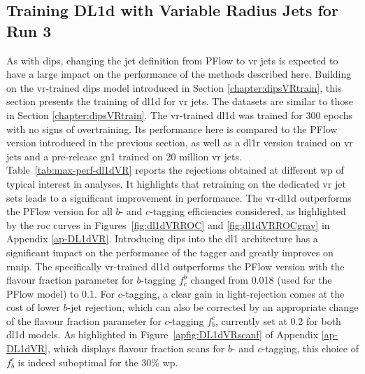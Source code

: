 \subsection{Training DL1d with Variable Radius Jets for Run 3}\label{sec:VRdl1dTrain}
As with \gls{dips}, changing the jet definition from PFlow to \gls{vr} jets is expected to have a large impact on the performance of the methods described here. Building on the \gls{vr}-trained \gls{dips} model introduced in Section \ref{chapter:dipsVRtrain}, this section presents the training of \gls{dl1d} for \gls{vr} jets. The datasets are similar to those in Section \ref{chapter:dipsVRtrain}. The \gls{vr}-trained \gls{dl1d} was trained for 300 epochs with no signs of overtraining. Its performance here is compared to the PFlow version introduced in the previous section, as well as a \gls{dl1r} version trained on \gls{vr} jets and a pre-release \gls{gn1} trained on 20 million \gls{vr} jets. \\

Table~\ref{tab:max-perf-dl1dVR} reports the rejections obtained at different \gls{wp} of typical interest in analyses. It highlights that retraining on the dedicated \gls{vr} jet sets leads to a significant improvement in performance. The \gls{vr}-\gls{dl1d} outperforms the PFlow version for all $b$- and $c$-tagging efficiencies considered, as highlighted by the \gls{roc} curves in Figures~\ref{fig:dl1dVRROC} and \ref{fig:dl1dVRROCgrav} in Appendix \ref{ap-DL1dVR}. Introducing \gls{dips} into the \gls{dl1} architecture has a significant impact on the performance of the tagger and greatly improves on \gls{rnnip}. The specifically \gls{vr}-trained \gls{dl1d} outperforms the PFlow version with the flavour fraction parameter for $b$-tagging $f^b_c$ changed from 0.018 (used for the PFlow model) to 0.1. For $c$-tagging, a clear gain in light-rejection comes at the cost of lower $b$-jet rejection, which can also be corrected by an appropriate change of the flavour fraction parameter for $c$-tagging $f^c_b$, currently set at 0.2 for both \gls{dl1d} models. As highlighted in Figure~\ref{apfig:DL1dVRscanf} of Appendix \ref{ap-DL1dVR}, which displays flavour fraction scans for $b$- and $c$-tagging, this choice of $f^c_b$ is indeed suboptimal for the 30\% \gls{wp}. \\

